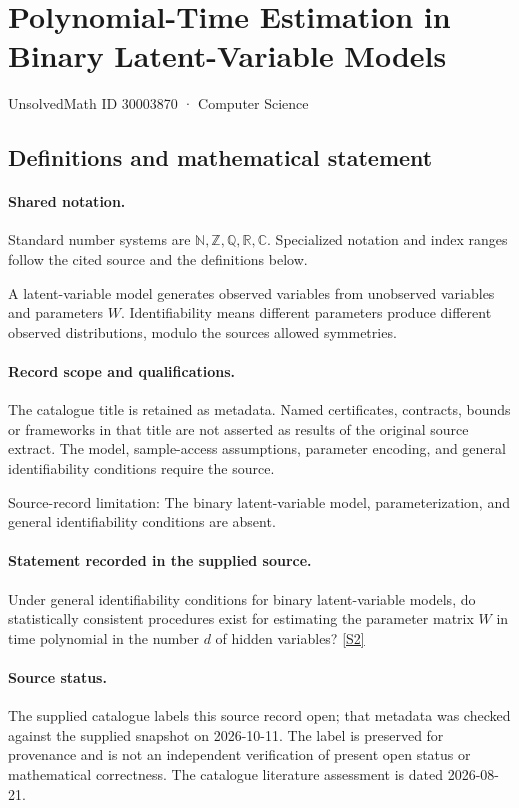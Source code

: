 \documentclass[11pt]{article}
\newcommand{\sref}[2]{\hyperlink{source:#1:#2}{[S#2]}}
\begin{document}
\setcounter{section}{30003869}
\section{Polynomial-Time Estimation in Binary Latent-Variable Models}\label{30003870}
{\small\sffamily UnsolvedMath ID 30003870 · Computer Science}
\subsection{Definitions and mathematical statement}

\paragraph{Shared notation.}Standard number systems are $\mathbb N,\mathbb Z,\mathbb Q,\mathbb R,\mathbb C$. Specialized notation and index ranges follow the cited source and the definitions below.


A latent-variable model generates observed variables from unobserved variables and parameters $W$. Identifiability means different parameters produce different observed distributions, modulo the source\textquotesingle s allowed symmetries.
\paragraph{Record scope and qualifications.}
The catalogue title is retained as metadata. Named certificates, contracts, bounds or frameworks in that title are not asserted as results of the original source extract.
The model, sample-access assumptions, parameter encoding, and general identifiability conditions require the source.

Source-record limitation: The binary latent-variable model, parameterization, and general identifiability conditions are absent.
\paragraph{Statement recorded in the supplied source.}
Under general identifiability conditions for binary latent-variable models, do statistically consistent procedures exist for estimating the parameter matrix $W$ in time polynomial in the number $d$ of hidden variables? \sref{30003870}{2}
\paragraph{Source status.}
The supplied catalogue labels this source record open; that metadata was checked against the supplied snapshot on 2026-10-11. The label is preserved for provenance and is not an independent verification of present open status or mathematical correctness. The catalogue literature assessment is dated 2026-08-21.
\end{document}
